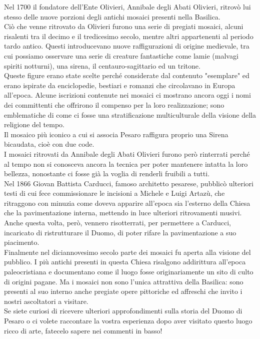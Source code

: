 \documentclass[hidelinks,12pt,a4paper]{article}
\begin{document}
\begin{flushleft}
		Nel 1700 il fondatore dell'Ente Olivieri, Annibale degli Abati Olivieri, ritrovò lui stesso delle nuove porzioni degli antichi mosaici presenti nella Basilica.\\
		Ciò che venne ritrovato da Olivieri furono una serie di pregiati mosaici, alcuni risalenti tra il decimo e il tredicesimo secolo, mentre altri appartenenti al periodo tardo antico. Questi introducevano nuove raffigurazioni di origine medievale, tra cui possiamo osservare una serie di creature fantastiche come lamie (malvagi spiriti notturni), una sirena, il centauro-sagittario ed un tritone.\\
		Queste figure erano state scelte perché considerate dal contenuto "esemplare" ed erano ispirate da enciclopedie, bestiari e romanzi che circolavano in Europa all'epoca. Alcune iscrizioni contenute nei mosaici ci mostrano ancora oggi i nomi dei committenti che offrirono il compenso per la loro realizzazione; sono emblematiche di come ci fosse una stratificazione multiculturale della visione della religione del tempo.\\
		Il mosaico più iconico a cui si associa Pesaro raffigura proprio una Sirena bicaudata, cioè con due code.\\
		I mosaici ritrovati da Annibale degli Abati Olivieri furono però rinterrati perché al tempo non si conosceva ancora la tecnica per poter mantenere intatta la loro bellezza, nonostante ci fosse già la voglia di renderli fruibili a tutti.\\
		Nel 1866 Giovan Battista Carducci, famoso architetto pesarese, pubblicò ulteriori testi di cui fece commissionare le incisioni a Michele e Luigi Artazù, che ritraggono con minuzia come doveva apparire all'epoca sia l'esterno della Chiesa che la pavimentazione interna, mettendo in luce ulteriori ritrovamenti musivi. Anche questa volta, però, vennero risotterrati, per permettere a Carducci, incaricato di ristrutturare il Duomo, di poter rifare la pavimentazione a suo piacimento.\\
		Finalmente nel diciannovesimo secolo parte dei mosaici fu aperta alla visione del pubblico. I più antichi presenti in questa Chiesa risalgono addirittura all'epoca paleocristiana e documentano come il luogo fosse originariamente un sito di culto di origini pagane. Ma i mosaici non sono l'unica attrattiva della Basilica: sono presenti al suo interno anche pregiate opere pittoriche ed affreschi che invito i nostri ascoltatori a visitare.\\
		Se siete curiosi di ricevere ulteriori approfondimenti sulla storia del Duomo di Pesaro o ci volete raccontare la vostra esperienza dopo aver visitato questo luogo ricco di arte, fatecelo sapere nei commenti in basso!\\

\end{flushleft}
\end{document}
